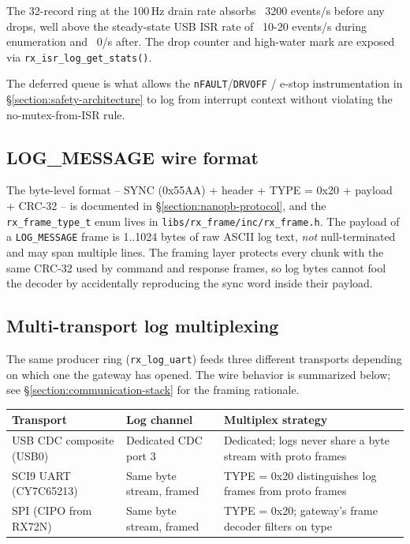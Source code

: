 The 32-record ring at the 100\,Hz drain rate absorbs ~3200 events/s
before any drops, well above the steady-state USB ISR rate of ~10-20
events/s during enumeration and ~0/s after. The drop counter and
high-water mark are exposed via \texttt{rx\_isr\_log\_get\_stats()}.

The deferred queue is what allows the
\texttt{nFAULT}/\texttt{DRVOFF} / e-stop instrumentation in
\S\ref{section:safety-architecture} to log from interrupt context
without violating the no-mutex-from-ISR rule.

\subsection{LOG\_MESSAGE wire format}

The byte-level format -- SYNC (0x55AA) + header + TYPE = 0x20 +
payload + CRC-32 -- is documented in
\S\ref{section:nanopb-protocol}, and the \texttt{rx\_frame\_type\_t}
enum lives in \texttt{libs/rx\_frame/inc/rx\_frame.h}. The payload of
a \texttt{LOG\_MESSAGE} frame is 1..1024 bytes of raw ASCII log text,
\textit{not} null-terminated and may span multiple lines. The framing
layer protects every chunk with the same CRC-32 used by command and
response frames, so log bytes cannot fool the decoder by accidentally
reproducing the sync word inside their payload.

\subsection{Multi-transport log multiplexing}

The same producer ring (\texttt{rx\_log\_uart}) feeds three different
transports depending on which one the gateway has opened. The wire
behavior is summarized below; see \S\ref{section:communication-stack}
for the framing rationale.

\begin{center}
\begin{tabular}{|l|p{4.0cm}|p{6.5cm}|}
\hline
\textbf{Transport}             & \textbf{Log channel}                & \textbf{Multiplex strategy}                                              \\
\hline
USB CDC composite (USB0)       & Dedicated CDC port 3                & Dedicated; logs never share a byte stream with proto frames              \\
SCI9 UART (CY7C65213)          & Same byte stream, framed            & TYPE = 0x20 distinguishes log frames from proto frames                   \\
SPI (CIPO from RX72N)          & Same byte stream, framed            & TYPE = 0x20; gateway's frame decoder filters on type                      \\
\hline
\end{tabular}
\end{center}

